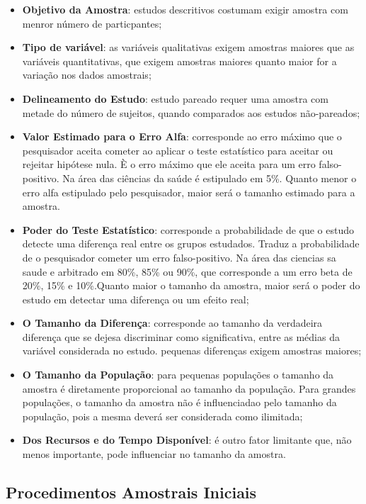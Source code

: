 \begin{itemize}
\item \textbf{Objetivo da Amostra}: estudos descritivos costumam exigir amostra com menror número de particpantes;
\item \textbf{Tipo de variável}: as variáveis qualitativas exigem amostras maiores que as variáveis quantitativas, que exigem amostras maiores quanto maior for a variação nos dados amostrais; 
\item \textbf{Delineamento do Estudo}: estudo pareado requer uma amostra com metade do número de sujeitos, quando comparados aos estudos não-pareados;
\item \textbf{Valor Estimado para o Erro Alfa}: corresponde ao erro máximo que o pesquisador aceita cometer ao aplicar o teste estatístico para aceitar ou rejeitar hipótese nula. È o erro máximo que ele aceita para um erro falso-positivo. Na área das ciências da saúde é estipulado em 5\%. Quanto menor o erro alfa estipulado pelo pesquisador, maior será o tamanho estimado para a amostra. 
\item \textbf{Poder do Teste Estatístico}: corresponde a probabilidade de que o estudo detecte uma diferença real entre os grupos estudados. Traduz a probabilidade de o pesquisador cometer um erro falso-positivo. Na área das ciencias sa saude e arbitrado em 80\%, 85\% ou 90\%, que corresponde a um erro beta de 20\%, 15\% e 10\%.Quanto maior o tamanho da amostra, maior será o poder do estudo em detectar uma diferença ou um efeito real;
\item \textbf{O Tamanho da Diferença}: corresponde ao tamanho da verdadeira diferença que se dejesa discriminar como significativa, entre as médias da variável considerada no estudo. pequenas diferenças exigem amostras maiores;
\item \textbf{O Tamanho da População}: para pequenas populações o tamanho da amostra é diretamente proporcional ao tamanho da população. Para grandes populações, o tamanho da amostra não é influenciadao pelo tamanho da população, pois a mesma deverá ser considerada como ilimitada;
\item\textbf{ Dos Recursos e do Tempo Disponível}: é outro fator limitante que, não menos importante, pode influenciar no tamanho da amostra.
\end{itemize}


\subsection{Procedimentos Amostrais Iniciais}

